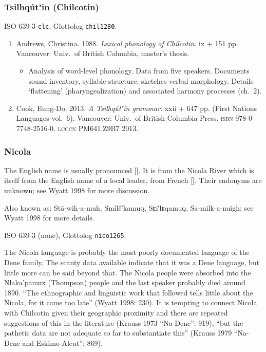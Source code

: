 \documentclass[12pt,letterpaper,oneside,article]{memoir}
\begin{document}
\subsubsection{Tsilhqútʼin (Chilcotin)}\label{sec:chilcotin}

ISO 639-3 \texttt{clc}, Glottolog \texttt{chil1280}.

\begin{enumerate}
\item	Andrews, Christina.
	1988.
	\textit{Lexical phonology of Chilcotin}.
	ix + 151 pp.
	Vancouver: Univ.\ of British Columbia, master’s thesis.
	\begin{itemize}
	\item	Analysis of word-level phonology.
		Data from five speakers.
		Documents sound inventory, syllable structure, sketches verbal morphology.
		Details ‘flattening’ (pharyngealization) and associated harmony
		processes (ch.\ 2).
	\end{itemize}
\item	Cook, Eung-Do.
	2013.
	\textit{A Tsilhqútʼín grammar}.
	xxii + 647 pp.
	(First Nations Languages vol.\ 6).
	Vancouver: Univ.\ of British Columbia Press.
	\textsc{isbn} 978-0-7748-2516-0.
	\textsc{lcccn} PM641.Z9B7 2013.
\end{enumerate}

\subsubsection{Nicola}\label{sec:nicola}

The English name  is usually pronounced [].
It is from the Nicola River which is itself from the English name of a local leader, from French  [].
Their endonyms are unknown; see Wyatt 1998 for more discussion.

Also known as: Stā-wih-a-muh, Smîlê′kamu\textsc{q}, Sᴇi′lᴇqamu\textsc{q}, Sa-milk-a-nuigh; see Wyatt 1998 for more details.

ISO 639-3 (none), Glottolog \texttt{nico1265}.

The Nicola language is probably the most poorly documented language of the Dene family.
The scanty data available indicate that it was a Dene language, but little more can be said beyond that.
The Nicola people were absorbed into the Nlaka'pamux (Thompson) people and the last speaker probably died around 1890.
“The ethnographic and linguistic work that followed tells little about the Nicola, for it came too late” (Wyatt 1998: 230).
It is tempting to connect Nicola with Chilcotin given their geographic proximity and there are repeated suggestions of this in the literature (Krauss 1973 “Na-Dene”: 919), “but the pathetic data are not adequate so far to substantiate this” (Krauss 1979 “Na-Dene and Eskimo-Aleut”: 869).
\end{document}
